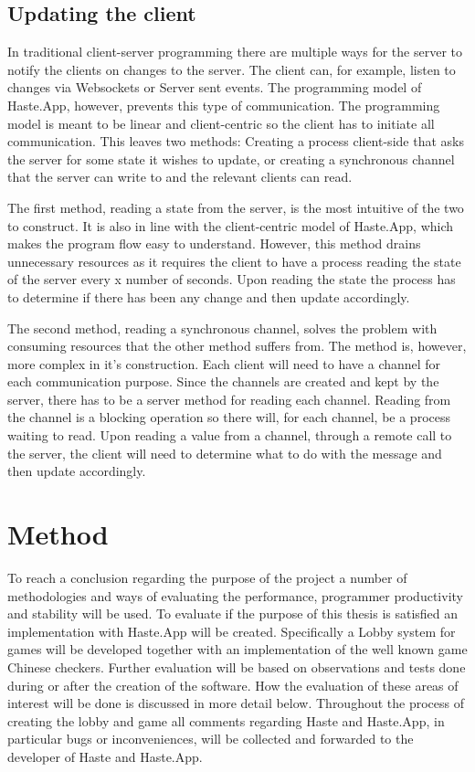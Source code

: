 \documentclass[a4paper]{article}
\begin{document}
\subsection{Updating the client}
\label{sub:updating-client}
In traditional client-server programming there are multiple ways for the server to notify the clients on changes to the server. The client can, for example, listen to changes via Websockets or Server sent events. The programming model of Haste.App, however, prevents this type of communication. The programming model is meant to be linear and client-centric so the client has to initiate all communication. This leaves two methods: Creating a process client-side that asks the server for some state it wishes to update, or creating a synchronous channel that the server can write to and the relevant clients can read. 

The first method, reading a state from the server, is the most intuitive of the two to construct. It is also in line with the client-centric model of Haste.App, which makes the program flow easy to understand. However, this method drains unnecessary resources as it requires the client to have a process reading the state of the server every x number of seconds. Upon reading the state the process has to determine if there has been any change and then update accordingly. 

The second method, reading a synchronous channel, solves the problem with consuming resources that the other method suffers from. The method is, however, more complex in it's construction. Each client will need to have a channel for each communication purpose. Since the channels are created and kept by the server, there has to be a server method for reading each channel. Reading from the channel is a blocking operation so there will, for each channel, be a process waiting to read. Upon reading a value from a channel, through a remote call to the server, the client will need to determine what to do with the message and then update accordingly. 


\section{Method}
\label{sec:method}
To reach a conclusion regarding the purpose of the project a number of methodologies and ways of evaluating the performance, programmer productivity and stability will be used. To evaluate if the purpose of this thesis is satisfied an implementation with Haste.App will be created. Specifically a Lobby system for games will be developed together with an implementation of the well known game Chinese checkers. Further evaluation will be based on observations and tests done during or after the creation of the software. How the evaluation of these areas of interest will be done is discussed in more detail below. Throughout the process of creating the lobby and game all comments regarding Haste and Haste.App, in particular bugs or inconveniences, will be collected and forwarded to the developer of Haste and Haste.App. 
\end{document}
